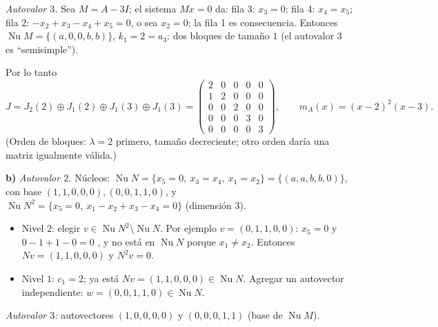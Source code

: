 \documentclass{article}
\DeclareMathOperator{\Nu}{Nu}
\theoremstyle{plain}
\theoremstyle{definition}
\theoremstyle{remark}
\begin{document}
\emph{Autovalor \(3\).} Sea \(M=A-3I\); el sistema \(Mx=0\) da: fila 3: \(x_3=0\); fila 4: \(x_4=x_5\); fila 2: \(-x_2+x_3-x_4+x_5=0\), o sea \(x_2=0\); la fila 1 es consecuencia. Entonces \(\Nu M=\{(a,0,0,b,b)\}\), \(k_1=2=a_3\): dos bloques de tamaño \(1\) (el autovalor \(3\) es ``semisimple'').

Por lo tanto
\[
    J=J_2(2)\oplus J_1(2)\oplus J_1(3)\oplus J_1(3)=\begin{pmatrix}2&0&0&0&0\\1&2&0&0&0\\0&0&2&0&0\\0&0&0&3&0\\0&0&0&0&3\end{pmatrix},\qquad m_A(x)=(x-2)^2(x-3).
\]
(Orden de bloques: \(\lambda=2\) primero, tamaño decreciente; otro orden daría una matriz igualmente válida.)

\textbf{b)} \emph{Autovalor \(2\).} Núcleos: \(\Nu N=\{x_5=0,\ x_3=x_4,\ x_1=x_2\}=\{(a,a,b,b,0)\}\), con base \((1,1,0,0,0),(0,0,1,1,0)\), y \(\Nu N^2=\{x_5=0,\ x_1-x_2+x_3-x_4=0\}\) (dimensión \(3\)).
\begin{itemize}
    \item Nivel \(2\): elegir \(v\in\Nu N^2\setminus\Nu N\). Por ejemplo \(v=(0,1,1,0,0)\): \(x_5=0\) y \(0-1+1-0=0\) \checkmark, y no está en \(\Nu N\) porque \(x_1\ne x_2\). Entonces
          \(Nv=(1,1,0,0,0)\) y \(N^2v=0\).
    \item Nivel \(1\): \(c_1=2\); ya está \(Nv=(1,1,0,0,0)\in\Nu N\). Agregar un autovector independiente: \(w=(0,0,1,1,0)\in\Nu N\).
\end{itemize}
\emph{Autovalor \(3\):} autovectores \((1,0,0,0,0)\) y \((0,0,0,1,1)\) (base de \(\Nu M\)).
\end{document}
